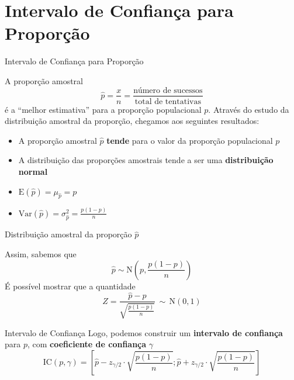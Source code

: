 \documentclass[14pt,aspectratio=1610]{beamer}
\begin{document}
\section{Intervalo de Confiança para Proporção}
\begin{frame}{Intervalo de Confiança para Proporção}
\vspace{-0.3cm}
\begin{block}{}
\justifying
A proporção amostral
$$
\hat{p} = \frac{x}{n} = \frac{\text{número de sucessos}}{\text{total de
tentativas}}
$$   
é a ``melhor estimativa'' para a proporção populacional $p.$ Através do estudo da distribuição amostral da proporção, chegamos aos seguintes resultados:

\begin{itemize}
    \item A proporção amostral $\hat{p}$ \textbf{tende} para o valor da proporção populacional $p$
    \item A distribuição das proporções amostrais tende a ser uma \textbf{distribuição normal}
    \item $\text{E}(\hat{p}) = \mu_{\hat{p}} = p$
    \item $\text{Var}(\hat{p}) = \sigma^{2}_{\hat{p}} = \frac{p(1-p)}{n}$
\end{itemize}
\end{block}
\end{frame}

\begin{frame}{Distribuição amostral da proporção $\hat{p}$}
    \begin{block}{}
    \justifying
Assim, sabemos que
$$
\hat{p} \sim \text{N} \left( p, \frac{p(1-p)}{n} \right)
$$   
É possível mostrar que a quantidade
$$
Z = \frac{\hat{p} - p}{\sqrt{\frac{p(1-p)}{n}}} \, \sim \, \text{N}(0,1)
$$   
    \end{block}
\end{frame}

\begin{frame}{}
    \begin{block}{Intervalo de Confiança}
    \justifying
  Logo, podemos construir um \textbf{intervalo de confiança} para $p$, com \textbf{coeficiente de confiança} $\gamma$
$$
\text{IC}(p, \gamma) = \left[ \hat{p} - z_{\gamma/2} \cdot
  \sqrt{\frac{p(1-p)}{n}} ;
  \hat{p} + z_{\gamma/2} \cdot
   \sqrt{\frac{p(1-p)}{n}}
  \right]
$$
\end{block}
\end{frame}
\end{document}
